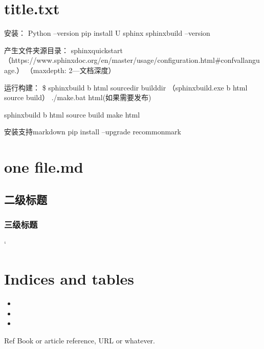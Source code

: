 \documentclass[a4paper,10pt,english,openany,oneside]{sphinxmanual}
\begin{document}
\chapter{title.txt}
\label{\detokenize{12.8:title-txt}}\label{\detokenize{12.8::doc}}
安装：
Python –version
pip install \sphinxhyphen{}U sphinx
sphinx\sphinxhyphen{}build –version

产生文件夹源目录：
sphinx\sphinxhyphen{}quickstart
（https://www.sphinx\sphinxhyphen{}doc.org/en/master/usage/configuration.html\#confval\sphinxhyphen{}language.）
（maxdepth: 2—文档深度）

运行构建：
\$ sphinx\sphinxhyphen{}build \sphinxhyphen{}b html sourcedir builddir
（sphinx\sphinxhyphen{}build.exe \sphinxhyphen{}b html source build）
./make.bat html(如果需要发布)

sphinx\sphinxhyphen{}build \sphinxhyphen{}b html source build
make html

安装支持markdown
pip install –upgrade recommonmark


\chapter{one file.md}
\label{\detokenize{aa:one-file-md}}\label{\detokenize{aa::doc}}

\section{二级标题}
\label{\detokenize{aa:id1}}

\subsection{三级标题}
\label{\detokenize{aa:id2}}
`


\chapter{Indices and tables}
\label{\detokenize{index:indices-and-tables}}\begin{itemize}
\item {} 

\item {} 

\item {} 

\end{itemize}

\begin{sphinxthebibliography}{Ref}
Book or article reference, URL or whatever.
\end{sphinxthebibliography}



\renewcommand{\indexname}{索引}

             {\footnotesize\raggedright\printindex}
             {\begin{sphinxtheindex}\end{sphinxtheindex}}
\end{document}
